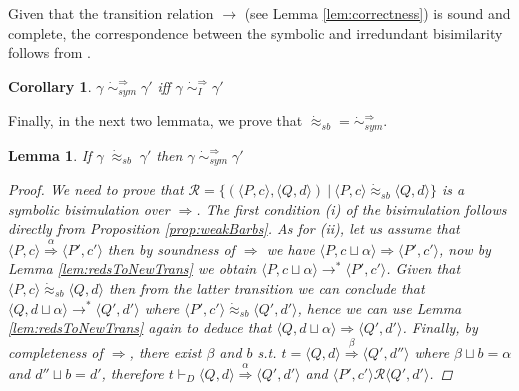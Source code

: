 \documentclass[copyright,creativecommons]{eptcs}
\newcommand{\rrarrow}{\longrightarrow}
\newcommand{\pairccp}[2]{\langle #1,#2 \rangle}
\newcommand{\trans}[1]{\stackrel{#1}{\rrarrow}}
\newcommand{\wsatbis}{\dot{\approx}_{sb}}
\newtheorem{corollary}{Corollary}
\newtheorem{lemma}{Lemma}
\newcommand{\newtrans}[1]{\stackrel{#1}{\Longrightarrow}}
\newcommand{\reds}{\rrarrow^*}
\newcommand{\R}{\mathcal{R}}
\newcommand{\A}{\alpha}
\newcommand{\B}{\beta}
\newcommand{\G}{\gamma}
\newcommand{\conf}[2]{\pairccp{#1}{#2}}
\newcommand{\deriv}{\vdash_D}
\newcommand{\newtransition}[5]{\conf{#1}{#2} \newtrans{#3} \conf{#4}{#5}}
\newcommand{\lub}{\sqcup}
\newcommand{\rel}[4]{\conf{#1}{#2} \R \conf{#3}{#4}}
\newcommand{\newirrbis}{\dot{\sim}^{\newtrans{}}_{I}}
\newcommand{\newsymbis}{\dot{\sim}^{\newtrans{}}_{sym}}
\begin{document}
Given that the transition relation $\trans{}$ (see Lemma \ref{lem:correctness}) is sound and complete,
the correspondence between the symbolic and irredundant bisimilarity follows from \cite{Aristizabal:12:SAC}.
\begin{corollary}
\label{cor:newSymEqNewIrr}
$\G \; \newsymbis \; \G'$ iff $\G \; \newirrbis \; \G'$
\end{corollary}

Finally, in the next two lemmata, we prove that $\wsatbis = \newsymbis$.
\begin{lemma}
\label{lem:weakToNewSym}
If $\G \; \wsatbis \; \G'$ then $\G \; \newsymbis \; \G'$
\begin{proof}
We need to prove that $\R = \{ (\conf{P}{c}, \conf{Q}{d}) \ |\ \conf{P}{c} \wsatbis
\conf{Q}{d}\}$ is a symbolic bisimulation over $\newtrans{}$. The first condition (i)
of the bisimulation follows directly from Proposition \ref{prop:weakBarbs}. As for
(ii), let us assume that $\newtransition{P}{c}{\A}{P'}{c'}$ then by soundness of
$\newtrans{}$ we have $\newtransition{P}{c \lub \A}{}{P'}{c'}$, now by Lemma
\ref{lem:redsToNewTrans} we obtain $\conf{P}{c \lub \A} \reds \conf{P'}{c'}$. Given
that $\conf{P}{c} \wsatbis \conf{Q}{d}$ then from the latter transition we can
conclude that $\conf{Q}{d \lub \A} \reds \conf{Q'}{d'}$ where $\conf{P'}{c'} \wsatbis
\conf{Q'}{d'}$, hence we can use Lemma \ref{lem:redsToNewTrans} again to deduce that
$\newtransition{Q}{d \lub \A}{}{Q'}{d'}$. Finally, by completeness of $\newtrans{}$,
there exist $\B$ and $b$ s.t. $t = \newtransition{Q}{d}{\B}{Q'}{d''}$ where $\B \lub b
= \A$ and $d'' \lub b = d'$, therefore $t \deriv \newtransition{Q}{d}{\A}{Q'}{d'}$ and
$\rel{P'}{c'}{Q'}{d'}$.
\end{proof}
\end{lemma}
\end{document}
